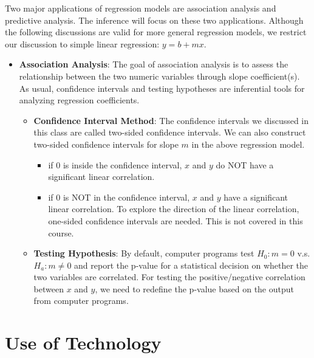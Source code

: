 \documentclass[
]{book}
\providecommand{\tightlist}{%
  \setlength{\itemsep}{0pt}\setlength{\parskip}{0pt}}
\begin{document}
Two major applications of regression models are association analysis and predictive analysis. The inference will focus on these two applications. Although the following discussions are valid for more general regression models, we restrict our discussion to simple linear regression: \(y = b + mx\).

\begin{itemize}
\item
  \textbf{Association Analysis}: The goal of association analysis is to assess the relationship between the two numeric variables through slope coefficient(s). As usual, confidence intervals and testing hypotheses are inferential tools for analyzing regression coefficients.

  \begin{itemize}
  \tightlist
  \item
    \textbf{Confidence Interval Method}: The confidence intervals we discussed in this class are called two-sided confidence intervals. We can also construct two-sided confidence intervals for slope \(m\) in the above regression model.

    \begin{itemize}
    \tightlist
    \item
      if \(0\) is inside the confidence interval, \(x\) and \(y\) do NOT have a significant linear correlation.
    \item
      if \(0\) is NOT in the confidence interval, \(x\) and \(y\) have a significant linear correlation. To explore the direction of the linear correlation, one-sided confidence intervals are needed. This is not covered in this course.
    \end{itemize}
  \item
    \textbf{Testing Hypothesis}: By default, computer programs test \(H_0: m = 0\) v.s. \(H_a: m \ne 0\) and report the p-value for a statistical decision on whether the two variables are correlated. For testing the positive/negative correlation between \(x\) and \(y\), we need to redefine the p-value based on the output from computer programs.
  \end{itemize}
\end{itemize}

\hfill\break

\hypertarget{use-of-technology-10}{%
\section{Use of Technology}\label{use-of-technology-10}}
\end{document}
